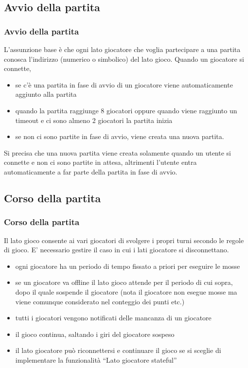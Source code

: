 \documentclass{beamer}
\begin{document}
\subsection{Avvio della partita}
\begin{frame}
\frametitle{Avvio della partita}
L'assunzione base \`e che ogni lato giocatore che voglia partecipare a
una partita conosca l'indirizzo (numerico o simbolico) del lato gioco. Quando un giocatore si connette, 
\begin{itemize}
\item se c'\`e una partita in fase di avvio di un giocatore viene automaticamente aggiunto alla partita
\item quando la partita raggiunge 8 giocatori oppure quando viene raggiunto un timeout e ci sono almeno 2 giocatori la partita inizia
\item se non ci sono partite in fase di avvio, viene creata una nuova partita.
\end{itemize}
Si precisa che una nuova partita viene creata solamente quando un
utente si connette e non ci sono partite in attesa, altrimenti
l'utente entra automaticamente a far parte della partita in fase di
avvio. 
\end{frame}

\subsection{Corso della partita}
\begin{frame}
\frametitle{Corso della partita}
Il lato gioco consente ai vari giocatori di svolgere i propri turni
secondo le regole di gioco. E' necessario gestire il caso in cui i
lati giocatore si disconnettano.
\begin{itemize}
\item ogni giocatore ha un periodo di tempo fissato a priori per  eseguire le mosse 
\item se un giocatore va offline il lato gioco attende per il periodo di
  cui sopra,
  dopo il quale sospende il giocatore (nota il giocatore non esegue
  mosse ma viene comunque considerato nel conteggio dei punti etc.) 
\item tutti i giocatori vengono notificati delle mancanza di un giocatore
\item il gioco continua, saltando i giri del giocatore sospeso
\item il lato giocatore pu\`o riconnettersi e continuare il gioco se si
  sceglie di implementare la funzionalit\`a ``Lato giocatore stateful''
   
\end{itemize}
\end{frame}
\end{document}
